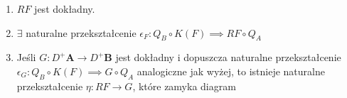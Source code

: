 \begin{fact}
  \begin{enumerate}
    \item $RF$ jest dokładny.
    \item $\exists$ naturalne przekształcenie $\epsilon_F:Q_B\circ K(F)\implies RF\circ Q_A$
    \item Jeśli $G:D^+\mathbf{A}\to D^+\mathbf{B}$ jest dokładny i dopuszcza naturalne przekształcenie $\epsilon_G:Q_B\circ K(F)\implies G\circ Q_A$ analogiczne jak wyżej, to istnieje naturalne przekształcenie $\eta:RF\to G$, które zamyka diagram
      \begin{center}\end{center}
  \end{enumerate}
\end{fact}


